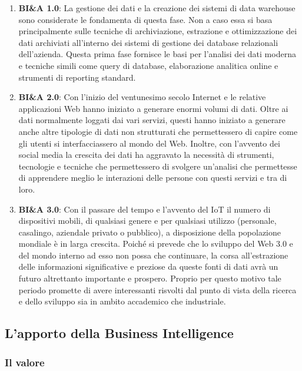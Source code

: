 \begin{enumerate}
    \item \textbf{BI\&A 1.0}: La gestione dei dati e la creazione dei sistemi di data warehouse sono considerate le fondamenta di questa fase. Non a caso essa si basa principalmente sulle tecniche di archiviazione, estrazione e ottimizzazione dei dati archiviati all'interno dei sistemi di gestione dei database relazionali dell'azienda. Questa prima fase fornisce le basi per l'analisi dei dati moderna e tecniche simili come query di database, elaborazione analitica online e strumenti di reporting standard.
    \item \textbf{BI\&A 2.0}: Con l'inizio del ventunesimo secolo Internet e le relative applicazioni Web hanno iniziato a generare enormi volumi di dati. Oltre ai dati normalmente loggati dai vari servizi, questi hanno iniziato a generare anche altre tipologie di dati non strutturati che permettessero di capire come gli utenti si interfacciassero al mondo del Web. Inoltre, con l'avvento dei social media la crescita dei dati ha aggravato la necessità di strumenti, tecnologie e tecniche che permettessero di svolgere un'analisi che permettesse di apprendere meglio le interazioni delle persone con questi servizi e tra di loro.
    \item \textbf{BI\&A 3.0}: Con il passare del tempo e l'avvento del IoT il numero di dispositivi mobili, di qualsiasi genere e per qualsiasi utilizzo (personale, casalingo, aziendale privato o pubblico), a disposizione della popolazione mondiale è in larga crescita. Poiché si prevede che lo sviluppo del Web 3.0 e del mondo interno ad esso non possa che continuare, la corsa all'estrazione delle informazioni significative e preziose da queste fonti di dati avrà un futuro altrettanto importante e prospero. Proprio per questo motivo tale periodo promette di avere interessanti risvolti dal punto di vista della ricerca e dello sviluppo sia in ambito accademico che industriale.
\end{enumerate}


\subsection{L'apporto della Business Intelligence}

\subsubsection{Il valore}

